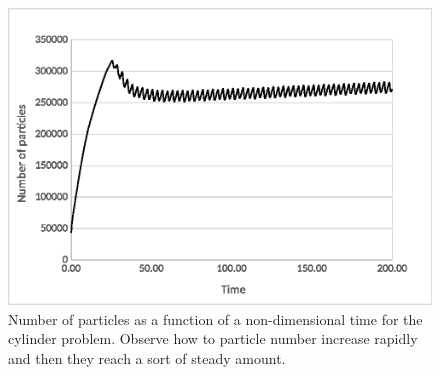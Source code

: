 \begin{figure}[htp] 
\centering 
\includegraphics[scale=.4]{./imgs/npart_cyl_excel.eps}
\caption{Number of particles as a function of a non-dimensional time for the cylinder problem. Observe how to particle number increase rapidly and then they reach a sort of steady amount.}
\label{fig:cyl_npart}
\end{figure}


